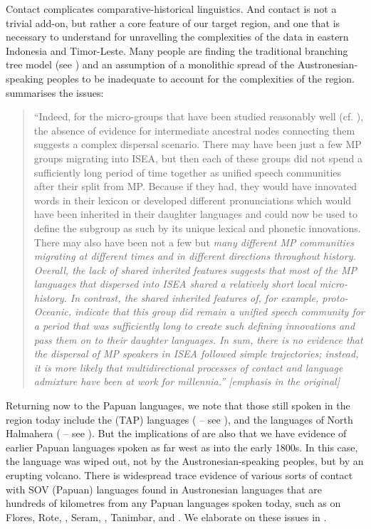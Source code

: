 Contact complicates comparative-historical linguistics.
And contact is not a trivial add-on,
but rather a core feature of our target region,
and one that is necessary to understand for unravelling
the complexities of the data in eastern Indonesia and Timor-Leste.
Many people are finding the traditional branching tree model (see )
and an assumption of a monolithic spread of the
Austronesian-speaking peoples to be inadequate to account
for the complexities of the region.
\citet[9]{Klamer2019} summarises the issues:

\begin{quote}
	``Indeed, for the micro-groups that have been studied reasonably well (cf.
	\citealp{Adelaar2005}), the absence of evidence for intermediate
	ancestral nodes connecting them suggests a complex dispersal scenario.
	There may have been just a few MP groups migrating into ISEA,
	but then each of these groups did not spend a sufficiently long period of time together as unified speech
	communities after their split from MP.
	Because if they had,
	they would have innovated words in their lexicon or developed different pronunciations which would have
	been inherited in their daughter languages
	and could now be used to define the subgroup as such by its unique lexical and phonetic innovations.
	There may also have been not a few but \it{many} different MP communities migrating at different times
	and in different directions throughout history.
	Overall, the lack of shared inherited features suggests that most of the MP languages that dispersed
	into ISEA shared a relatively short local micro-history.
	In contrast, the shared inherited features of,
	for example, proto-Oceanic, indicate that this group did remain a unified speech community for a period
	that was sufficiently long to create such defining innovations
	and pass them on to their daughter languages.
	In sum, there is no evidence that the dispersal of MP speakers in ISEA followed simple trajectories;
	instead, it is more likely that multidirectional processes of contact
	and language admixture have been at work for millennia.''
	\citep[9]{Klamer2019} [emphasis in the original]
\end{quote}

Returning now to the Papuan languages,
we note that those still spoken in the region today include the  (TAP) languages
(\citealp{Klamer2017,HoltonRobinson2017} -- see ),
and the  languages of North Halmahera
(\citealp{Voorhoeve1988,GrimesGrimes1994,HoltonKlamer2018} -- see ).
But the implications of \citet{Donohue2007} are also that we have evidence of earlier Papuan languages
spoken as far west as  into the early 1800s.
In this case, the  language was wiped out,
not by the Austronesian-speaking peoples,
but by an erupting volcano.
There is widespread trace evidence of various sorts of contact with SOV (Papuan) languages found
in Austronesian languages that are hundreds of kilometres from any Papuan languages spoken today,
such as on Flores,
Rote, , Seram, , Tanimbar, and .
We elaborate on these issues in .

